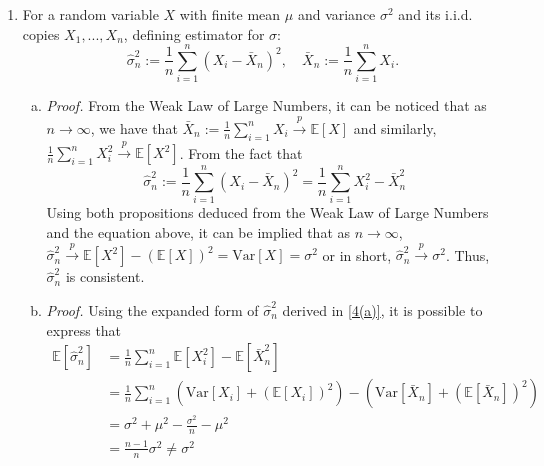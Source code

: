 \documentclass[a4paper,10pt]{article}
\begin{document}
\begin{enumerate}
\begin{enumerate}[(a)]
\end{enumerate}
\pagebreak
\item For a random variable $X$ with finite mean $\mu$ and variance $\sigma^2$ and its i.i.d. copies $X_1,...,X_n$, defining estimator for $\sigma$:
\begin{equation*}
	\hat{\sigma}_n^2 := \frac{1}{n} \sum_{i=1}^{n} \left(X_i-\bar{X}_n\right)^2, \quad \bar{X}_n := \frac{1}{n} \sum_{i=1}^n X_i.
\end{equation*}
\begin{enumerate}[(a)]
	\item \label{4(a)} \textit{Proof.} From the Weak Law of Large Numbers, it can be noticed that as $n \to \infty$, we have that $\bar{X}_n := \frac{1}{n} \sum_{i=1}^{n} X_i \overset{p}{\to} \mathbb{E}\!\left[X\right]$ and similarly, $\frac{1}{n} \sum_{i=1}^{n} X_i^2 \overset{p}{\to} \mathbb{E}\!\left[X^2\right]$. 
	From the fact that
	\begin{equation*}
		\hat{\sigma}_n^2 := \frac{1}{n} \sum_{i=1}^{n} \left(X_i-\bar{X}_n\right)^2 = \frac{1}{n} \sum_{i=1}^{n} X_i^2 - \bar{X}_n^2
	\end{equation*}
	Using both propositions deduced from the Weak Law of Large Numbers and the equation above, it can be implied that as $n \to \infty$, $\hat{\sigma}_n^2 \overset{p}{\to} \mathbb{E}\!\left[X^2\right]- \left(\mathbb{E}\!\left[X\right]\right)^2 = \mathrm{Var}\!\left[X\right]= \sigma^2$ or in short, $\hat{\sigma}_n^2 \overset{p}{\to} \sigma^2$. Thus, $\hat{\sigma}_n^2$ is consistent. \qedsymbol
	\item \label{4(b)} \textit{Proof.} Using the expanded form of $\hat{\sigma}_n^2$ derived in \ref{4(a)}, it is possible to express that
	\begin{equation*}
		\begin{aligned}
			\mathbb{E}\!\left[\hat{\sigma}_n^2\right] &= \frac{1}{n} \sum_{i=1}^n \mathbb{E}\!\left[X_i^2\right] - \mathbb{E}\!\left[\bar{X}_n^2\right] \\
			&= \frac{1}{n} \sum_{i=1}^n \left(\mathrm{Var}\!\left[X_i\right]+\left(\mathbb{E}\!\left[X_i\right]\right)^2\right) - \left(\mathrm{Var}\!\left[\bar{X}_n\right]+\left(\mathbb{E}\!\left[\bar{X}_n\right]\right)^2\right) \\
			&= \sigma^2 + \mu^2 - \frac{\sigma^2}{n} - \mu^2 \\
			&= \frac{n-1}{n} \sigma^2 \neq \sigma^2
		\end{aligned}
	\end{equation*}

\end{enumerate}
\end{enumerate}
\end{document}
